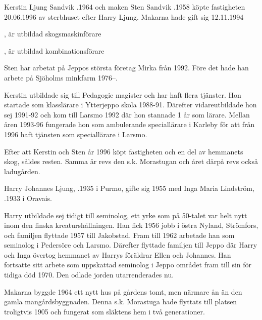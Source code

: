 


Kerstin Ljung Sandvik .1964 och maken Sten Sandvik .1958 köpte fastigheten 20.06.1996 av sterbhuset efter Harry Ljung. Makarna hade gift sig 12.11.1994

\begin{jhchildren}
  \item {}, är utbildad skogsmaskinförare
  \item {}, är utbildad kombinationsförare
\end{jhchildren}

Sten har arbetat på Jeppos största företag Mirka från 1992. Före det hade han arbete på Sjöholms minkfarm 1976--.

Kerstin utbildade sig till Pedagogie magister och har haft flera tjänster. Hon startade som klasslärare i Ytterjeppo skola 1988-91. Därefter vidareutbildade hon sej 1991-92 och kom till Larsmo 1992 där hon stannade 1 år som lärare. Mellan åren 1993-96 fungerade hon som ambulerande speciallärare i Karleby för att från 1996 haft tjänsten som speciallärare i Larsmo.

Efter att Kerstin och Sten år 1996 köpt fastigheten och en del av hemmanets skog, såldes resten. Samma år revs den s.k. Morastugan och året därpå revs också ladugården.


Harry Johannes Ljung, .1935 i Purmo, gifte sig 1955 med Inga Maria Lindström, .1933 i Oravais.

Harry utbildade sej tidigt till seminolog, ett yrke som på 50-talet var helt nytt inom den finska kreaturshållningen. Han fick 1956 jobb i östra Nyland, Strömfors, och familjen flyttade 1957 till Jakobstad. Fram till 1962 arbetade han som seminolog i Pedersöre och Larsmo. Därefter flyttade familjen till Jeppo där Harry och Inga övertog hemmanet av Harrys föräldrar Ellen och Johannes. Han fortsatte sitt arbete som uppskattad seminolog i Jeppo området fram till sin för tidiga död 1970. Den odlade jorden utarrenderades nu.

Makarna byggde 1964 ett nytt hus på gårdens tomt, men närmare ån än den gamla mangårdsbyggnaden. Denna s.k. Morastuga hade flyttats till platsen troligtvis 1905 och fungerat som släktens hem i två generationer.

